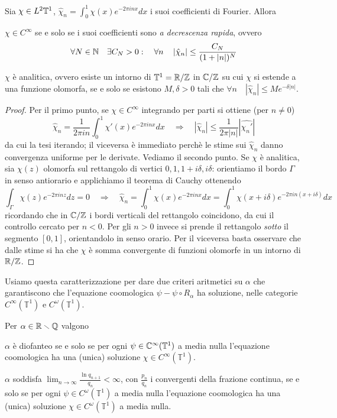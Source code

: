 \begin{teo}Sia $\chi\in L^2\mathbb{T}^1$, $\hat\chi_n=\int_0^1\chi(x)e^{-2\pi inx}dx$ i suoi coefficienti di Fourier. Allora
\begin{lista}
 \item $\chi\in C^\infty$ se e solo se i suoi coefficienti sono \emph{a decrescenza rapida}, ovvero
      \[\forall N\in \mathbb{N}\quad \exists C_N>0: \quad \forall n \quad \left|\hat\chi_n\right|\leq\frac{C_N}{(1+|n|)^N}\]
 \item $\chi$ è analitica, ovvero esiste un intorno di $\mathbb{T}^1=\mathbb{R}/\mathbb{Z}$ in $\mathbb{C}/\mathbb{Z}$ su cui $\chi$ si estende a una funzione olomorfa, se e solo se esistono $M,\delta>0$ tali che $\forall n \quad \left|\hat\chi_n\right|\leq Me^{-\delta |n|}$.
\end{lista}
\end{teo}
\begin{proof}
 Per il primo punto, se $\chi\in C^\infty$ integrando per parti si ottiene (per $n\neq 0$)
 \[\hat\chi_n=\frac{1}{2\pi in}\int_0^1\chi'(x)e^{-2\pi inx}dx \quad \Rightarrow \quad \left|\hat\chi_n\right|\leq \frac{1}{2\pi |n|}\left|\widehat{\chi_n'}\right|\]
 da cui la tesi iterando; il viceversa è immediato perchè le stime sui $\hat\chi_n$ danno convergenza uniforme per le derivate.
 Vediamo il secondo punto. Se $\chi$ è analitica, sia $\chi(z)$ olomorfa sul rettangolo di vertici $0, 1,1+i\delta,i\delta$: orientiamo il bordo $\Gamma$ in senso antiorario e applichiamo il teorema di Cauchy ottenendo
 \[\int_\Gamma \chi(z)e^{-2\pi inz}dz=0 \quad \Rightarrow \quad \hat\chi_n=\int_0^1\chi(x)e^{-2\pi inx}dx=\int_0^1\chi(x+i\delta)e^{-2\pi in(x+i\delta)}dx\]
 ricordando che in $\mathbb{C}/\mathbb{Z}$ i bordi verticali del rettangolo coincidono, da cui il controllo cercato per $n<0$. Per gli $n>0$ invece si prende il rettangolo \emph{sotto} il segmento $[0,1]$, orientandolo in senso orario. Per il viceversa basta osservare che dalle stime si ha che $\chi$ è somma convergente di funzioni olomorfe in un intorno di $\mathbb{R}/\mathbb{Z}$.
\end{proof}

Usiamo questa caratterizzazione per dare due criteri aritmetici su $\alpha$ che garantiscono
che l'equazione coomologica $\psi-\psi\circ R_\alpha$ ha soluzione,
nelle categorie $C^\infty(\mathbb{T}^1)$ e $C^\omega(\mathbb{T}^1)$.

\begin{teo}Per $\alpha\in\mathbb{R}\smallsetminus\mathbb{Q}$ valgono
\begin{lista}
\item $\alpha$ è diofanteo se e solo se per ogni $\psi\in\mathbb{C}^\infty(\mathbb{T}^1)$ a media nulla
l'equazione coomologica ha una (unica) soluzione $\chi\in C^\infty(\mathbb{T}^1)$.
\item $\alpha$ soddisfa $\lim_{n\to\infty}\frac{\ln q_{n+1}}{q_n}<\infty$, con $\frac{p_n}{q_n}$ i convergenti della frazione continua,
se e solo se per ogni $\psi\in C^\omega(\mathbb{T}^1)$ a media nulla
l'equazione coomologica ha una (unica) soluzione $\chi\in C^\omega(\mathbb{T}^1)$ a media nulla.
\end{lista}
\end{teo}

